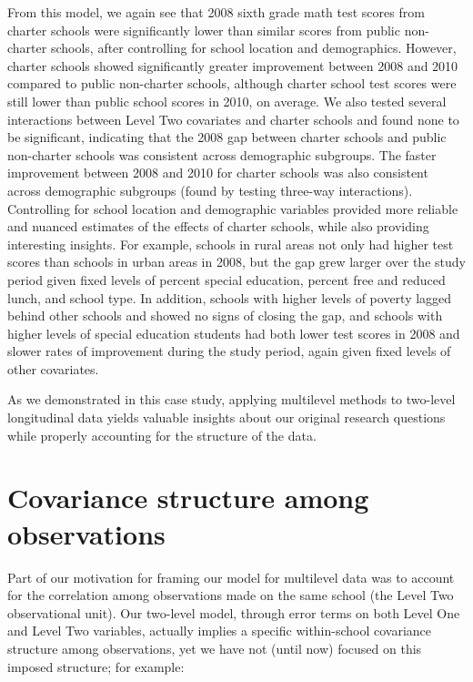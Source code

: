 \documentclass[
]{krantz}
\begin{document}
From this model, we again see that 2008 sixth grade math test scores from charter schools were significantly lower than similar scores from public non-charter schools, after controlling for school location and demographics. However, charter schools showed significantly greater improvement between 2008 and 2010 compared to public non-charter schools, although charter school test scores were still lower than public school scores in 2010, on average. We also tested several interactions between Level Two covariates and charter schools and found none to be significant, indicating that the 2008 gap between charter schools and public non-charter schools was consistent across demographic subgroups. The faster improvement between 2008 and 2010 for charter schools was also consistent across demographic subgroups (found by testing three-way interactions). Controlling for school location and demographic variables provided more reliable and nuanced estimates of the effects of charter schools, while also providing interesting insights. For example, schools in rural areas not only had higher test scores than schools in urban areas in 2008, but the gap grew larger over the study period given fixed levels of percent special education, percent free and reduced lunch, and school type. In addition, schools with higher levels of poverty lagged behind other schools and showed no signs of closing the gap, and schools with higher levels of special education students had both lower test scores in 2008 and slower rates of improvement during the study period, again given fixed levels of other covariates.

As we demonstrated in this case study, applying multilevel methods to two-level longitudinal data yields valuable insights about our original research questions while properly accounting for the structure of the data.

\hypertarget{errorcovariance}{%
\section{Covariance structure among observations}\label{errorcovariance}}

Part of our motivation for framing our model for multilevel data was to account for the correlation among observations made on the same school (the Level Two observational unit). Our two-level model, through error terms on both Level One and Level Two variables, actually implies a specific within-school covariance structure among observations, yet we have not (until now) focused on this imposed structure; for example:
\end{document}
